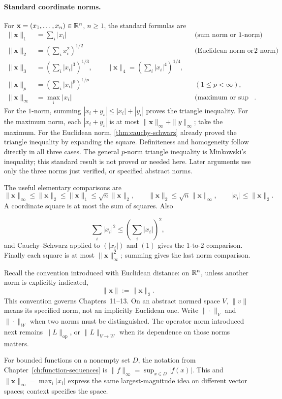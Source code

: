 \paragraph{Standard coordinate norms.}\label{par:standard-coordinate-norms}
For $\mathbf{x}=(x_1,\ldots,x_n)\in\mathbb{R}^n$, $n\geq1$, the standard formulas are
\[
\begin{aligned}
\|\mathbf{x}\|_1&=\sum_i|x_i| &&\text{(sum norm or $1$-norm)},\\
\|\mathbf{x}\|_2&=\left(\sum_i x_i^2\right)^{1/2}
 &&\text{(Euclidean norm or $2$-norm)},\\
\|\mathbf{x}\|_3&=\left(\sum_i|x_i|^3\right)^{1/3},\qquad
\|\mathbf{x}\|_4=\left(\sum_i|x_i|^4\right)^{1/4},\\
\|\mathbf{x}\|_p&=\left(\sum_i|x_i|^p\right)^{1/p}
 &&(1\leq p<\infty),\\
\|\mathbf{x}\|_\infty&=\max_i|x_i| &&\text{(maximum or sup norm)}.
\end{aligned}
\]
For the $1$-norm, summing $|x_i+y_i|\leq|x_i|+|y_i|$ proves the triangle
inequality. For the maximum norm, each $|x_i+y_i|$ is at most
$\|\mathbf{x}\|_\infty+\|y\|_\infty$; take the maximum. For the Euclidean norm,
\cref{thm:cauchy-schwarz} already proved the triangle inequality by
expanding the square. Definiteness and homogeneity follow directly in
all three cases. The general $p$-norm triangle inequality is Minkowski's
inequality; this standard result is not proved or needed here. Later
arguments use only the three norms just verified, or specified abstract norms.

The useful elementary comparisons are
\[
\|\mathbf{x}\|_\infty\leq\|\mathbf{x}\|_2\leq\|\mathbf{x}\|_1\leq\sqrt n\|\mathbf{x}\|_2,
\qquad \|\mathbf{x}\|_2\leq\sqrt n\|\mathbf{x}\|_\infty,
\qquad |x_i|\leq\|\mathbf{x}\|_2.
\]
A coordinate square is at most the sum of squares. Also

\[
\sum_i|x_i|^2\leq(\sum_i|x_i|)^2,
\]
 and Cauchy--Schwarz applied to
$(|x_i|)$ and $(1)$ gives the $1$-to-$2$ comparison. Finally each square
is at most $\|\mathbf{x}\|_\infty^2$; summing gives the last norm comparison.

\begin{remark}\label{rem:euclidean-norm-default}
Recall the convention introduced with Euclidean distance: on $\mathbb{R}^n$, unless
another norm is explicitly indicated,
\[
\boxed{\|\mathbf{x}\|:=\|\mathbf{x}\|_2.}
\]
This convention governs Chapters~11--13. On an abstract normed space $V$,
$\|v\|$ means its specified norm, not an implicitly Euclidean one.
Write $\|\cdot\|_V$ and $\|\cdot\|_W$ when two norms must be distinguished.
The operator norm introduced next remains $\|L\|_{\mathrm{op}}$, or
$\|L\|_{V\to W}$ when its dependence on those norms matters.
\end{remark}
For bounded functions on a nonempty set $D$, the notation from
Chapter~\ref{ch:function-sequences} is $\|f\|_\infty=\sup_{x\in D}|f(x)|$.
This and $\|\mathbf{x}\|_\infty=\max_i|x_i|$ express the same largest-magnitude
idea on different vector spaces; context specifies the space.

